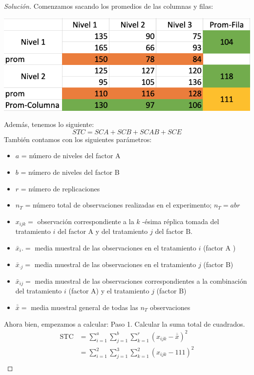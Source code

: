 \documentclass[a4paper,12pt]{article}
\newenvironment{solution}
  {\renewcommand\qedsymbol{$\blacksquare$}\begin{proof}[Solución]}
  {\end{proof}}
\begin{document}
\begin{solution}
Comenzamos sacando los promedios de las columnas y filas: 
\begin{center}
    \includegraphics[scale=0.5]{Images/28-tabla.png}
\end{center}
Además, tenemos lo siguiente: 
$$STC=SCA+SCB+SCAB+SCE$$
También contamos con los siguientes parámetros: \begin{itemize}
    \item $a$ = número de niveles del factor A
    \item $b$ = número de niveles del factor B 
    \item $r$ = número de replicaciones
    \item $n_T$ = número total de observaciones realizadas en el experimento; $n_T= abr$
    \item $x_{i j k}=$ observación correspondiente a la $k$ -ésima réplica tomada del tratamiento $i$ del factor A y del tratamiento $j$ del factor $\mathrm{B}$.
    \item  $\bar{x}_{i} .=$ media muestral de las observaciones en el tratamiento $i$ (factor $\mathrm{A}$ )
    \item $\bar{x}_{\cdot j}=$ media muestral de las observaciones en el tratamiento $j$ (factor B)
    \item $\bar{x}_{i j}=$ media muestral de las observaciones correspondientes a la combinación del tratamiento $i$ (factor A) y el tratamiento $j$ (factor B)
    \item $\overline{\bar{x}}=$ media muestral general de todas las $n_{T}$ observaciones
\end{itemize}
Ahora bien, empezamos a calcular: \newline\newline
Paso 1. Calcular la suma total de cuadrados.
\begin{align}
    \mathrm{STC} &=\sum_{i=1}^{a} \sum_{j=1}^{b} \sum_{k=1}^{r}\left(x_{i j k}-\overline{\bar{x}}\right)^{2}\\
    &= \sum_{i=1}^{2} \sum_{j=1}^{3} \sum_{k=1}^{2}\left(x_{i j k}-111\right)^{2}\\

\end{align}
\end{solution}
\end{document}
